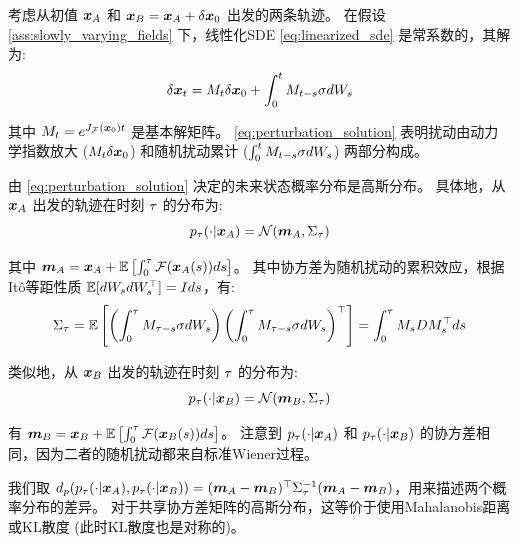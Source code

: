 考虑从初值 $\bm{x}_A$ 和 $\bm{x}_B = \bm{x}_A + \delta\bm{x}_0$ 出发的两条轨迹。
在假设 \ref{ass:slowly_varying_fields} 下，线性化SDE \eqref{eq:linearized_sde} 是常系数的，其解为:
\begin{equation}
\label{eq:perturbation_solution}
    \delta\bm{x}_t = M_t \delta\bm{x}_0 + \int_0^t M_{t-s} \sigma dW_s
\end{equation}

其中 $M_t = e^{J_{\mathcal{F}}(\bm{x}_0) t}$ 是基本解矩阵。
\eqref{eq:perturbation_solution} 表明扰动由动力学指数放大 ($M_t \delta\bm{x}_0$) 和随机扰动累计 ($\int_0^t M_{t-s}\sigma dW_s$) 两部分构成。

由 \eqref{eq:perturbation_solution} 决定的未来状态概率分布是高斯分布。
具体地，从 $\bm{x}_A$ 出发的轨迹在时刻 $\tau$ 的分布为:
\begin{equation}
\label{eq:gaussian_distribution_of_perturbation_A}
    p_{\tau}(\cdot|\bm{x}_A) = \mathcal{N}(\bm{m}_A, \Sigma_{\tau})
\end{equation}

其中 $\bm{m}_A = \bm{x}_A + \mathbb{E}\left[\int_0^{\tau} \mathcal{F}(\bm{x}_A(s)) ds\right]$。
其中协方差为随机扰动的累积效应，根据Itô等距性质 $\mathbb{E}[dW_s dW_s^\top] = I ds$，有:
\begin{equation}
\label{eq:covariance_of_perturbation}
    \Sigma_{\tau} = \mathbb{E}\left[\left(\int_0^{\tau} M_{\tau-s}\sigma dW_s\right) \left(\int_0^{\tau} M_{\tau-s}\sigma dW_s\right)^\top\right] = \int_0^{\tau} M_s D M_s^\top ds
\end{equation}

类似地，从 $\bm{x}_B$ 出发的轨迹在时刻 $\tau$ 的分布为:
\begin{equation}
\label{eq:gaussian_distribution_of_perturbation_B}
    p_{\tau}(\cdot|\bm{x}_B) = \mathcal{N}(\bm{m}_B, \Sigma_{\tau})
\end{equation}

有 $\bm{m}_B = \bm{x}_B + \mathbb{E}\left[\int_0^{\tau} \mathcal{F}(\bm{x}_B(s)) ds\right]$。
注意到 $p_{\tau}(\cdot|\bm{x}_A)$ 和 $p_{\tau}(\cdot|\bm{x}_B)$ 的协方差相同，因为二者的随机扰动都来自标准Wiener过程。

我们取 $d_p(p_{\tau}(\cdot|\bm{x}_A), p_{\tau}(\cdot|\bm{x}_B)) = (\bm{m}_A - \bm{m}_B)^\top \Sigma_{\tau}^{-1} (\bm{m}_A - \bm{m}_B)$，用来描述两个概率分布的差异。
对于共享协方差矩阵的高斯分布，这等价于使用Mahalanobis距离或KL散度 (此时KL散度也是对称的)。

